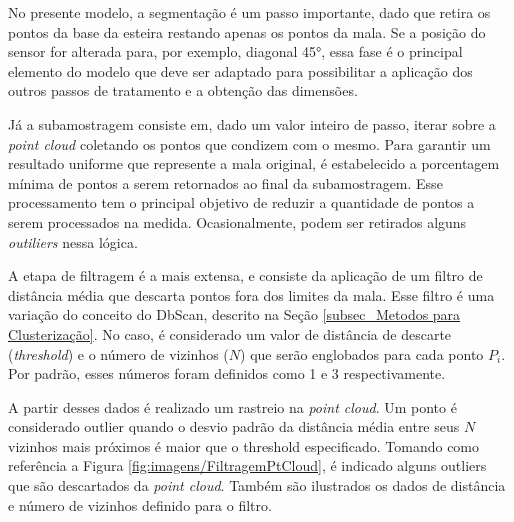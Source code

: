     
    No presente modelo, a segmentação é um passo importante, dado que retira os pontos da base da esteira restando apenas os pontos da mala. Se a posição do sensor for alterada para, por exemplo, diagonal 45°, essa fase é o principal elemento do modelo que deve ser adaptado para possibilitar a aplicação dos outros passos de tratamento e a obtenção das dimensões. 
    

    Já a subamostragem consiste em, dado um valor inteiro de passo, iterar sobre a \textit{point cloud} coletando os pontos que condizem com o mesmo. Para garantir um resultado uniforme que represente a mala original, é estabelecido a porcentagem mínima de pontos a serem retornados ao final da subamostragem. Esse processamento tem o principal objetivo de reduzir a quantidade de pontos a serem processados na medida. Ocasionalmente, podem ser retirados alguns \textit{outiliers} nessa lógica.



    A etapa de filtragem é a mais extensa, e consiste da aplicação de um filtro de distância média que descarta pontos fora dos limites da mala. Esse filtro é uma variação do conceito do DbScan, descrito na Seção \ref{subsec_Metodos para Clusterização}. No caso, é considerado um valor de distância de descarte (\textit{threshold}) e o número de vizinhos ($N$) que serão englobados para cada ponto $P_i$. Por padrão, esses números foram definidos como 1 e 3 respectivamente. 
    
    A partir desses dados é realizado um rastreio na \textit{point cloud}. Um ponto é considerado outlier quando o desvio padrão da distância média entre seus $N$ vizinhos mais próximos é maior que o threshold especificado. Tomando como referência a Figura \ref{fig:imagens/FiltragemPtCloud}, é indicado alguns outliers que são descartados da \textit{point cloud}. Também são ilustrados os dados de distância e número de vizinhos definido para o filtro.

